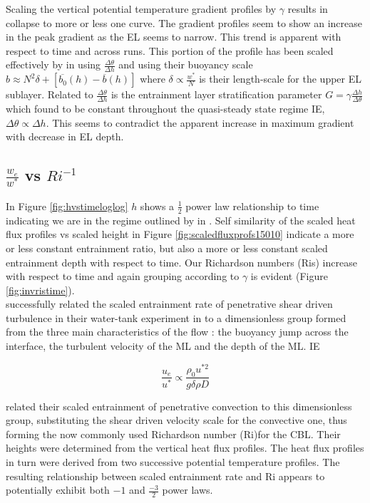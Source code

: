 Scaling the vertical potential temperature gradient profiles by $\gamma$ results in collapse to more or less one curve.  The gradient profiles seem to show an increase in the peak gradient as the \acs{EL} seems to narrow. This trend is apparent with respect to time and across runs.  This portion of the profile has been scaled effectively by \citeauthor{Sorbjan1} in \cite{Sorbjan1} using $\frac{\Delta \theta}{\Delta h}$ and \citeauthor{GarciaMellado} using their buoyancy scale $b \approx N^{2} \delta + [\overline{b_{0}}(h) - \overline{b}(h)]$ where $\delta \propto \frac{w^{*}}{N}$ is their length-scale for the upper \acs{EL} sublayer.  Related to $\frac{\Delta \theta}{\Delta h}$ is the entrainment layer stratification parameter $G = \gamma \frac{\Delta h}{\Delta \theta}$ which \citeauthor{FedConzMir04} found to be constant throughout the quasi-steady state regime IE, $\Delta \theta \propto \Delta h$.  This seems to contradict the apparent increase in maximum gradient with decrease in \acs{EL} depth.

\subsection{$\frac{w_{e}}{w^{*}}$ vs $Ri^{-1}$}
\FloatBarrier

In Figure \ref{fig:hvstimeloglog} $h$ shows a $\frac{1}{2}$ power law relationship to time indicating we are in the regime outlined by \citeauthor{FedConzMir04} in \cite{FedConzMir04}.  Self similarity of the scaled heat flux profiles vs scaled height in Figure \ref{fig:scaledfluxprofs15010} indicate a more or less constant entrainment ratio, but also a more or less constant scaled entrainment depth with respect to time. Our Richardson numbers (\acs{Ri}s) increase with respect to time and again grouping according to $\gamma$ is evident (Figure \ref{fig:invristime}).\\


\citeauthor{KatoPhil} successfully related
the scaled entrainment rate of penetrative shear driven turbulence
in their water-tank experiment in \cite{KatoPhil}
to a  dimensionless group formed from the three main characteristics
of the flow : the buoyancy jump across the interface, the turbulent velocity of the \acs{ML} and the depth of the \acs{ML}. IE

\begin{equation}
\frac{u_{e}}{u^{*}} \propto \frac{\rho_{0} u^{*2}}{g \delta \rho D} 
\end{equation}

\citeauthor{DearWill80} related their scaled entrainment of penetrative convection to this dimensionless group, substituting the shear driven velocity scale for the convective one, thus forming the now commonly used Richardson number (\acs{Ri})for the \acs{CBL}.  Their heights were determined from the vertical heat flux profiles.  The heat flux profiles in turn were derived from two successive potential temperature profiles.  The resulting relationship between scaled entrainment rate and \acs{Ri} appears to potentially exhibit both $-1$ and $\frac{-3}{2}$ power laws.\\

